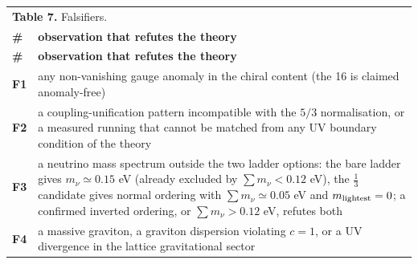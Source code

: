 \documentclass[aps,prd,amsmath,amssymb,superscriptaddress,longbibliography,floatfix,preprint]{revtex4-2}
\begin{document}
{\scriptsize
\renewcommand{\arraystretch}{1.45}

\begin{longtable}{ll}
\multicolumn{2}{l}{\textbf{Table 7.} Falsifiers.} \\
\addlinespace[2pt]
\toprule
\textbf{\#} & \parbox[c]{13.91cm}{\vspace{2.5pt}\raggedright {} \textbf{observation that refutes the theory}\vspace{2.5pt}} \\
\midrule
\endfirsthead
\toprule
\textbf{\#} & \parbox[c]{13.91cm}{\vspace{2.5pt}\raggedright {} \textbf{observation that refutes the theory}\vspace{2.5pt}} \\
\midrule
\endhead
\midrule
\endfoot
\bottomrule
\endlastfoot
\textbf{F1} & \parbox[c]{13.91cm}{\vspace{2.5pt}\raggedright {} any non-vanishing gauge anomaly in the chiral content (the 16 is claimed anomaly-free)\vspace{2.5pt}} \\
\hline{}
\textbf{F2} & \parbox[c]{13.91cm}{\vspace{2.5pt}\raggedright {} a coupling-unification pattern incompatible with the \mbox{$5/3$} normalisation, or a measured running that cannot be matched from any UV boundary condition of the theory\vspace{2.5pt}} \\
\hline{}
\textbf{F3} & \parbox[c]{13.91cm}{\vspace{2.5pt}\raggedright {} a neutrino mass spectrum outside the two ladder options: the bare ladder gives \mbox{$m_\nu \simeq 0.15$} eV (already excluded by \mbox{$\sum m_\nu < 0.12$} eV), the \mbox{$\tfrac13$} candidate gives normal ordering with \mbox{$\sum m_\nu \simeq 0.05$} eV and $m_{\rm lightest} = 0$; a confirmed inverted ordering, or \mbox{$\sum m_\nu > 0.12$} eV, refutes both\vspace{2.5pt}} \\
\hline{}
\textbf{F4} & \parbox[c]{13.91cm}{\vspace{2.5pt}\raggedright {} a massive graviton, a graviton dispersion violating \mbox{$c = 1$}, or a UV divergence in the lattice gravitational sector\vspace{2.5pt}} \\

\end{longtable}}
\end{document}
